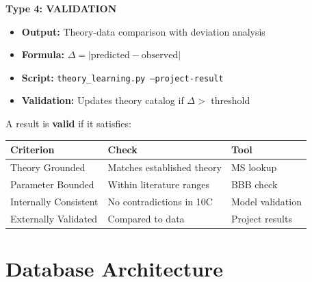 \begin{tcolorbox}[colback=blue!5!white, colframe=blue!75!black,
    title=\textbf{The Four Result Types}]
\vspace{0.5em}
\textbf{Type 4: VALIDATION}
\begin{itemize}[nosep]
    \item \textbf{Output:} Theory-data comparison with deviation analysis
    \item \textbf{Formula:} $\Delta = |\text{predicted} - \text{observed}|$
    \item \textbf{Script:} \texttt{theory\_learning.py --project-result}
    \item \textbf{Validation:} Updates theory catalog if $\Delta > $ threshold
\end{itemize}

\end{tcolorbox}

\begin{tcolorbox}[colback=green!5!white, colframe=green!75!black,
    title=\textbf{Result Quality Criteria}]

A result is \textbf{valid} if it satisfies:

\begin{center}
\begin{tabular}{|l|l|l|}
\hline
\textbf{Criterion} & \textbf{Check} & \textbf{Tool} \\
\hline
\hline
Theory Grounded & Matches established theory & MS lookup \\
Parameter Bounded & Within literature ranges & BBB check \\
Internally Consistent & No contradictions in 10C & Model validation \\
Externally Validated & Compared to data & Project results \\
\hline
\end{tabular}
\end{center}

\end{tcolorbox}

\section{Database Architecture}
\label{sec:dp-databases}

